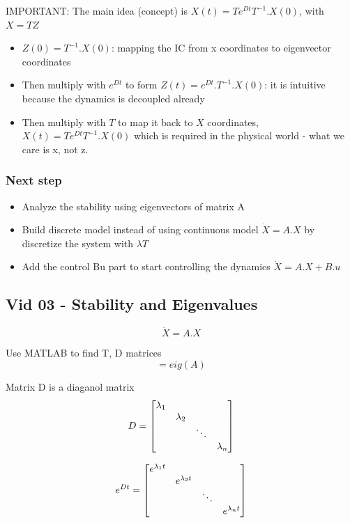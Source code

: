 \documentclass{article}
\begin{document}
IMPORTANT: The main idea (concept) is $X(t) = Te^{Dt}T^{-1}.X(0)$, with $X = TZ$
\begin{itemize}
  \item $Z(0) = T^{-1}.X(0)$: mapping the IC from x coordinates to eigenvector coordinates 
  \item Then multiply with $e^{Dt}$ to form $Z(t) = e^{Dt}.T^{-1}.X(0)$: it is intuitive because the dynamics is decoupled already
  \item Then multiply with $T$ to map it back to $X$ coordinates, $X(t) = Te^{Dt}T^{-1}.X(0)$  which is required in the physical world - what we care is x, not z.
\end{itemize}


\subsubsection{Next step}
\begin{itemize}
  \item Analyze the stability using eigenvectors of matrix A
  \item Build discrete model instead of using continuous model $ \dot{X} = A.X $ by discretize the system with $\lambda T$
  \item Add the control Bu part to start controlling the dynamics $\dot{X} = A.X  + B.u$
\end{itemize}


\subsection{Vid 03 - Stability and Eigenvalues}
\begin{equation} 
  \dot{X} = A.X
\end{equation}

Use MATLAB to find T, D matrices
\begin{equation}
  [T, D] = eig(A)
\end{equation}

Matrix D is a diaganol matrix
\begin{equation} 
  D = 
  \begin{bmatrix}
      $$\lambda_{1}$$ &  &  &\\ 
      & $$\lambda_{2}$$   &  &\\ 
      & & \ddots & \\ 
      & & & $$\lambda_{n}$$
  \end{bmatrix}
\end{equation}

\begin{equation} 
  e^{Dt} = 
    \begin{bmatrix} 
        $$e^{\lambda_{1}t}$$  &  &  & \\ 
        & $$e^{\lambda_{2}t}$$   &  & \\ 
        & & \ddots & \\ 
        & & & $$e^{\lambda_{n}t}$$
      \end{bmatrix} 
\end{equation}
\end{document}
